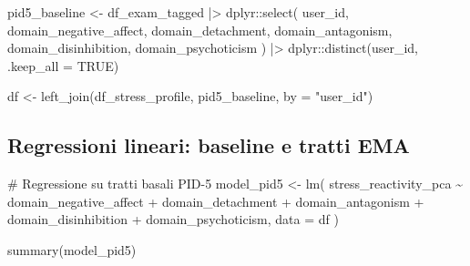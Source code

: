 \documentclass[
  11pt,
  a4paper,
  onecolumn]{article}
\newenvironment{Shaded}{}{}
\newcommand{\AttributeTok}[1]{\textcolor[rgb]{0.84,0.23,0.29}{#1}}
\newcommand{\CommentTok}[1]{\textcolor[rgb]{0.42,0.45,0.49}{#1}}
\newcommand{\ConstantTok}[1]{\textcolor[rgb]{0.00,0.36,0.77}{#1}}
\newcommand{\FunctionTok}[1]{\textcolor[rgb]{0.44,0.26,0.76}{#1}}
\newcommand{\NormalTok}[1]{\textcolor[rgb]{0.14,0.16,0.18}{#1}}
\newcommand{\OtherTok}[1]{\textcolor[rgb]{0.44,0.26,0.76}{#1}}
\newcommand{\SpecialCharTok}[1]{\textcolor[rgb]{0.00,0.36,0.77}{#1}}
\newcommand{\StringTok}[1]{\textcolor[rgb]{0.01,0.18,0.38}{#1}}
\begin{document}
\begin{Shaded}
\begin{Highlighting}[]
\NormalTok{pid5\_baseline }\OtherTok{\textless{}{-}}\NormalTok{ df\_exam\_tagged }\SpecialCharTok{|\textgreater{}} 
\NormalTok{  dplyr}\SpecialCharTok{::}\FunctionTok{select}\NormalTok{(}
\NormalTok{    user\_id, domain\_negative\_affect, domain\_detachment, domain\_antagonism,}
\NormalTok{    domain\_disinhibition, domain\_psychoticism}
\NormalTok{  ) }\SpecialCharTok{|\textgreater{}} 
\NormalTok{  dplyr}\SpecialCharTok{::}\FunctionTok{distinct}\NormalTok{(user\_id, }\AttributeTok{.keep\_all =} \ConstantTok{TRUE}\NormalTok{)}
\end{Highlighting}
\end{Shaded}

\begin{Shaded}
\begin{Highlighting}[]
\NormalTok{df }\OtherTok{\textless{}{-}} \FunctionTok{left\_join}\NormalTok{(df\_stress\_profile, pid5\_baseline, }\AttributeTok{by =} \StringTok{"user\_id"}\NormalTok{) }
\end{Highlighting}
\end{Shaded}

\subsection{Regressioni lineari: baseline e tratti
EMA}\label{regressioni-lineari-baseline-e-tratti-ema}

\begin{Shaded}
\begin{Highlighting}[]
\CommentTok{\# Regressione su tratti basali PID{-}5}
\NormalTok{model\_pid5 }\OtherTok{\textless{}{-}} \FunctionTok{lm}\NormalTok{(}
\NormalTok{  stress\_reactivity\_pca }\SpecialCharTok{\textasciitilde{}} 
\NormalTok{    domain\_negative\_affect }\SpecialCharTok{+}
\NormalTok{    domain\_detachment }\SpecialCharTok{+}
\NormalTok{    domain\_antagonism }\SpecialCharTok{+}
\NormalTok{    domain\_disinhibition }\SpecialCharTok{+}
\NormalTok{    domain\_psychoticism,}
  \AttributeTok{data =}\NormalTok{ df}
\NormalTok{)}
\end{Highlighting}
\end{Shaded}

\begin{Shaded}
\begin{Highlighting}[]
\FunctionTok{summary}\NormalTok{(model\_pid5)}
\end{Highlighting}
\end{Shaded}
\end{document}
